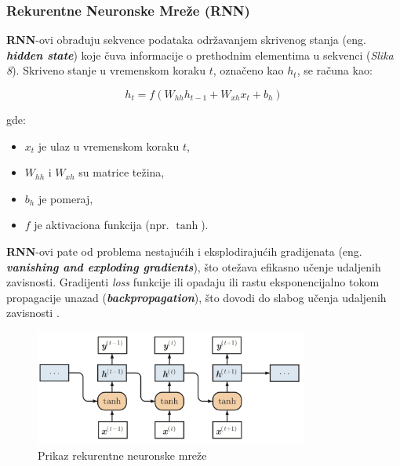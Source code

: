\documentclass[12pt]{article}
\begin{document}
   \subsubsection{Rekurentne Neuronske Mreže (RNN)}
   \textbf{RNN}-ovi obrađuju sekvence podataka održavanjem skrivenog stanja (eng. \textbf{\textit{hidden state}}) 
   koje čuva informacije o prethodnim elementima u sekvenci (\textit{Slika 8}). 
   Skriveno stanje u vremenskom koraku \( t \), označeno kao \( h_t \), se računa kao:

   \[ h_t = f(W_{hh} h_{t-1} + W_{xh} x_t + b_h) \]

   gde:
   \begin{itemize}
      \vspace{-0.5cm}
      \setlength\itemsep{0.2em} %
      \item \( x_t \) je ulaz u vremenskom koraku \( t \),
      \item \( W_{hh} \) i \( W_{xh} \) su matrice težina,
      \item \( b_h \) je pomeraj,
      \item \( f \) je aktivaciona funkcija (npr. \(\tanh\)).
   \end{itemize}

   \textbf{RNN}-ovi pate od problema nestajućih i eksplodirajućih gradijenata (eng. \textbf{\textit{vanishing and exploding gradients}}), 
   što otežava efikasno učenje udaljenih zavisnosti. Gradijenti \textit{loss} funkcije ili opadaju ili rastu 
   eksponencijalno tokom propagacije unazad (\textbf{\textit{backpropagation}}), što dovodi 
   do slabog učenja udaljenih zavisnosti \cite{rnn_downsides}.
   
   \begin{figure}[h!]
      \centering
      \vspace{1.5cm} %
      \includegraphics[width=0.8\textwidth]{rnn.png}
      \caption{Prikaz rekurentne neuronske mreže \cite{rnn_pic}}
      \label{fig:rnn}
   \end{figure}
\end{document}
